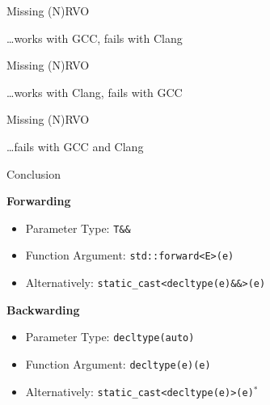 \begin{frame}
\end{frame}

\begin{frame}
    \scalebox{3.}{More things that don't work}
\end{frame}

\begin{frame}[fragile]{Missing (N)RVO}

    \hfill \ldots works with GCC, fails with Clang
\end{frame}


\begin{frame}[fragile]{Missing (N)RVO}

    \hfill \ldots works with Clang, fails with GCC
\end{frame}

\begin{frame}[fragile]{Missing (N)RVO}

    \hfill \ldots fails with GCC and Clang
\end{frame}

\begin{frame}{Conclusion}
    \begin{center}
    \end{center}
    
    \textbf{Forwarding}
    \begin{itemize}
        \item Parameter Type: \texttt{T\&\&}
        \item Function Argument: \texttt{std::forward<E>(e)}
        \item Alternatively: \texttt{static\_cast<decltype(e)\&\&>(e)}
    \end{itemize}

    \textbf{Backwarding}
    \begin{itemize}
        \item Parameter Type: \texttt{decltype(auto)}
        \item Function Argument: \texttt{decltype(e)(e)}
        \item Alternatively: \texttt{static\_cast<decltype(e)>(e)}{\color{vertexDarkRed}${}^*$}
    \end{itemize}
\end{frame}
